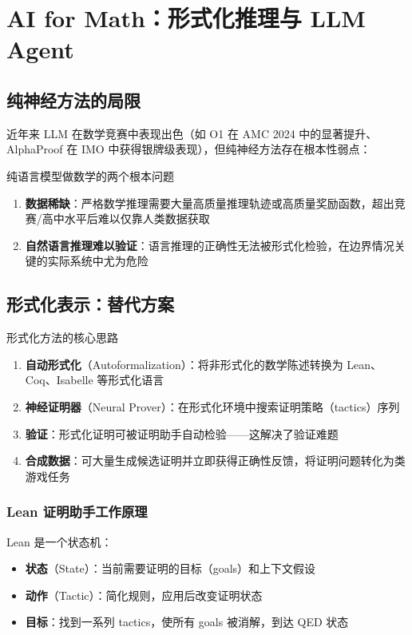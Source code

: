 \section{AI for Math：形式化推理与 LLM Agent}

\subsection{纯神经方法的局限}

近年来 LLM 在数学竞赛中表现出色（如 O1 在 AMC 2024 中的显著提升、AlphaProof 在 IMO 中获得银牌级表现），但纯神经方法存在根本性弱点：

\begin{warningbox}{纯语言模型做数学的两个根本问题}
\begin{enumerate}
    \item \textbf{数据稀缺}：严格数学推理需要大量高质量推理轨迹或高质量奖励函数，超出竞赛/高中水平后难以仅靠人类数据获取
    \item \textbf{自然语言推理难以验证}：语言推理的正确性无法被形式化检验，在边界情况关键的实际系统中尤为危险
\end{enumerate}
\end{warningbox}

\subsection{形式化表示：替代方案}

\begin{importantbox}{形式化方法的核心思路}
\begin{enumerate}
    \item \textbf{自动形式化}（Autoformalization）：将非形式化的数学陈述转换为 Lean、Coq、Isabelle 等形式化语言
    \item \textbf{神经证明器}（Neural Prover）：在形式化环境中搜索证明策略（tactics）序列
    \item \textbf{验证}：形式化证明可被证明助手自动检验——这解决了验证难题
    \item \textbf{合成数据}：可大量生成候选证明并立即获得正确性反馈，将证明问题转化为类游戏任务
\end{enumerate}
\end{importantbox}

\subsubsection{Lean 证明助手工作原理}

Lean 是一个状态机：
\begin{itemize}
    \item \textbf{状态}（State）：当前需要证明的目标（goals）和上下文假设
    \item \textbf{动作}（Tactic）：简化规则，应用后改变证明状态
    \item \textbf{目标}：找到一系列 tactics，使所有 goals 被消解，到达 QED 状态
\end{itemize}

